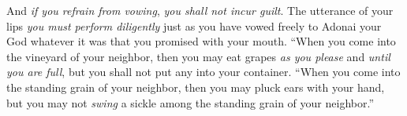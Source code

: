 \begin{biblechapter}
\verse And \textit{if you refrain from vowing}, \textit{you shall not incur guilt}.
\verse The utterance of your lips \textit{you must perform diligently} just as you have vowed freely to Adonai your God whatever it was that you promised with your mouth.
\verse “When you come into the vineyard of your neighbor, then you may eat grapes \textit{as you please} and \textit{until you are full}, but you shall not put any into your container.
\verse “When you come into the standing grain of your neighbor, then you may pluck ears with your hand, but you may not \textit{swing} a sickle among the standing grain of your neighbor.”
\end{biblechapter}

